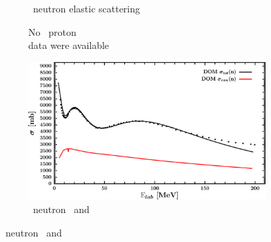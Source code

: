\begin{figure}[hbtp]
\begin{subfigure}[c]{0.39\textheight}
        \caption{\pbEight\ neutron elastic scattering}
        \label{DOMFitData_pb208_neutron_elastic}
    \end{subfigure}\vspace{0.70in}
    \begin{subfigure}[c]{0.45\textwidth}
        \centering
        \caption{No \pbEight\ proton \rxn\\ data were available}
        \label{DOMFitData_pb208_proton_inelastic}
    \end{subfigure}\hspace{6pt}
    \begin{subfigure}[c]{0.45\textwidth}
        \centering
        \includegraphics[width=\linewidth]{figures/pb208_neutronInelastic.png}
        \caption{\pbEight\ neutron \rxn\ and \tot}
        \label{DOMFitData_pb208_neutron_inelastic}
    \end{subfigure}
\end{figure}
\afterpage{\clearpage}
